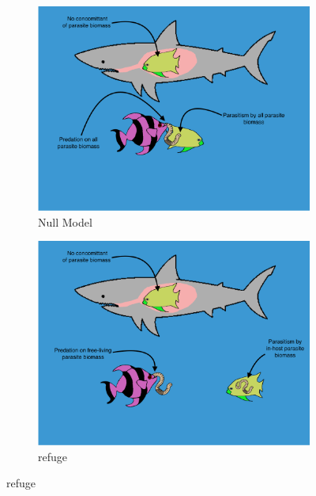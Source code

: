 \documentclass[11pt]{amsart}
\begin{document}
\begin{figure}
\begin{subfigure}{.45\textwidth}
\caption{Null Model\label{subfig:modelsa}}
\includegraphics[width=\textwidth]{figures/Null.png}
\end{subfigure}
\begin{subfigure}{.45\textwidth}
\caption{refuge\label{subfig:modelsb}}
\includegraphics[width=\textwidth]{figures/Null+Ref.png}
\end{subfigure}


\end{figure}
\end{document}
